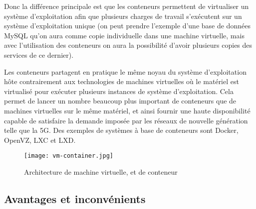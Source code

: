 Donc la différence principale est que les conteneurs permettent de virtualiser un système d'exploitation afin que plusieurs charges de travail s'exécutent sur un système d'exploitation unique (on peut prendre l'exemple d'une base de données MySQL qu'on aura comme copie individuelle dans une machine virtuelle, mais avec l'utilisation des conteneurs on aura la possibilité d'avoir plusieurs copies des services de ce dernier).\par
Les conteneurs partagent en pratique le même noyau du système d'exploitation hôte contrairement aux technologies de machines virtuelles où le matériel est virtualisé pour exécuter plusieurs instances de système d'exploitation. Cela permet de lancer un nombre beaucoup plus important de conteneurs que de machines virtuelles sur le même matériel, et ainsi fournir une haute disponibilité capable de satisfaire la demande imposée par les réseaux de nouvelle génération telle que la 5G. Des exemples de systèmes à base de conteneurs sont Docker, OpenVZ, LXC et LXD. 
\begin{figure}[H]
\centering
\texttt{[image: vm-container.jpg]}
\caption{Architecture de machine virtuelle, et de conteneur \cite{alibabacloud}}
\label{fig:vmvsconteneur}
\end{figure}

\subsection{Avantages et inconvénients}
